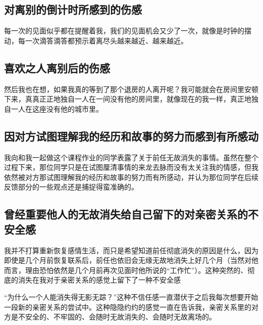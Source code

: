 


\subsection*{对离别的倒计时所感到的伤感}

每一次的见面似乎都在提醒着我，我们的见面机会又少了一次，就像是时钟的摆动，每一次滴答滴答都预示着离尽头越来越近、越来越近。




\subsection*{喜欢之人离别后的伤感}

然后我也在想，如果我真的等到了那个退房的人离开呢？我可能就会在房间里安顿下来，真真正正地独自一人在一间没有他的房间里，就像现在的我一样，真正地独自一人在这座没有他的城市里。




\subsection*{因对方试图理解我的经历和故事的努力而感到有所感动}

我向和我一起做这个课程作业的同学表露了关于前任无故消失的事情。虽然在整个过程下来，那位同学只是在试图厘清事情的来龙去脉而没有太关注我的情感，但我依然被对方那试图理解我的经历和故事的努力而有所感动，并认为那位同学在后续反馈部分的一些观点还是捕捉得蛮准确的。




\subsection*{曾经重要他人的无故消失给自己留下的对亲密关系的不安全感}

我并不打算重新恢复感情生活，而只是希望知道前任彻底消失的原因是什么，因为即使是几个月前恢复联系后，前任也依旧会无缘无故地消失上好几个月（当然对他而言，理由恐怕依然是几个月前再次见面时他所说的“工作忙”）。这种突然的、彻底的消失在我对于亲密关系的感觉上留下了一种不安全感

“为什么一个人能消失得无影无踪？”这种不信任感一直潜伏于之后我每次想要开始一段新的亲密关系的尝试中。这种隐隐约约的感觉一直在告诉我，亲密关系里的对方是不安全的、不牢固的、会随时无故消失的、会随时无故离场的。


